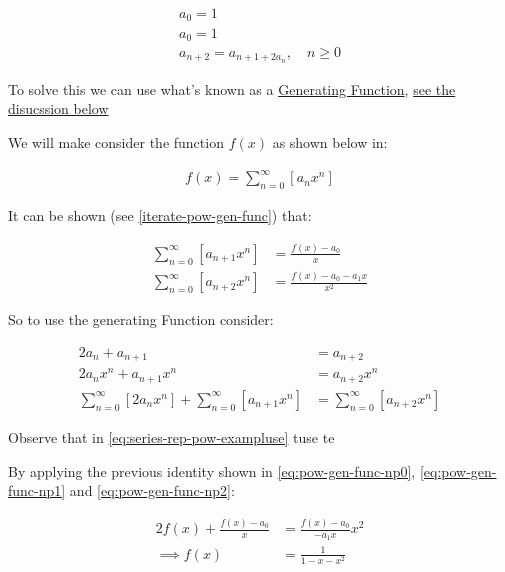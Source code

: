 \documentclass[11pt]{article}
\begin{document}
\begin{align*}
a_0= 1 \\
a_0= 1 \\
a_{n+  2} =  a_{n+  1 +  2 a_n}, \quad n \geq 0
\end{align*}

To solve this we can use what's known as a
\href{https://en.wikipedia.org/wiki/Generating\_function}{Generating
Function}, \hyperref[sec:orgdfa6c3d]{see the disucssion below}

We will make consider the function \(f(x)\) as shown below in:

\begin{align}
f\left( x \right)= \sum^{\infty}_{n= 0}   \left[ a_nx^n \right] \label{eq:pow-gen-func-np0}
\end{align}


It can be shown (see \eqref{iterate-pow-gen-func}) that:


\begin{align}
    \sum^{\infty}_{n= 0}  \left[ a_{n+  1} x^n \right] &= \frac{f\left( x \right)- a_0}{x} \label{eq:pow-gen-func-np1} \\
\sum^{\infty}_{n= 0}  \left[ a_{n+  2} x^n \right]  &= \frac{f\left( x \right) - a_0 - a_1x}{x^2} \label{eq:pow-gen-func-np2}
\end{align}

So to use the generating Function consider:

\begin{align}
    2a_n +  a_{n+  1 }&= a_{n+  2} \nonumber \\
    2a_nx^n +  a_{n+  1 } x^n &= a_{n+  2} x^n \nonumber \\
    \sum^{\infty}_{n= 0}   \left[ 2a_nx^n \right] + \sum^{\infty}_{n= 0}   \left[  a_{n+  1 } x^n  \right]   &= \sum^{\infty}_{n= 0}   \left[ a_{n+  2} x^n   \right] \label{eq:series-rep-pow-example}
\end{align}

Observe that in \eqref{eq:series-rep-pow-exampluse} tuse te

By applying the previous identity shown in \eqref{eq:pow-gen-func-np0}, \eqref{eq:pow-gen-func-np1} and \eqref{eq:pow-gen-func-np2}:

\begin{align}
2f\left( x \right) +  \frac{f\left( x \right)- a_0}{x} &= \frac{f\left( x \right)- a_0}{- a_1x}x^2 \nonumber \\
\implies  f\left( x \right) &=  \frac{1}{1- x- x^2} \label{eq:power-series-form-example}
\end{align}
\end{document}
